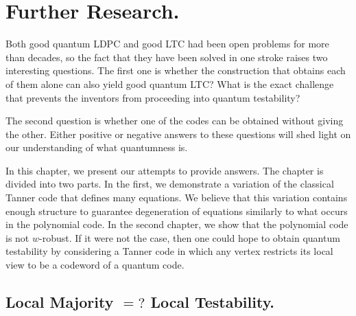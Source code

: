 
\chapter{Further Research.}
Both good quantum LDPC and good LTC had been open problems for more than decades, so the fact that they have been solved in one stroke raises two interesting questions. The first one is whether the construction that obtains each of them alone can also yield good quantum LTC? What is the exact challenge that prevents the inventors from proceeding into quantum testability?

The second question is whether one of the codes can be obtained without giving the other. Either positive or negative answers to these questions will shed light on our understanding of what quantumness is.

In this chapter, we present our attempts to provide answers. The chapter is divided into two parts. In the first, we demonstrate a variation of the classical Tanner code that defines many equations. We believe that this variation contains enough structure to guarantee degeneration of equations similarly to what occurs in the polynomial code. In the second chapter, we show that the polynomial code is not $w$-robust. If it were not the case, then one could hope to obtain quantum testability by considering a Tanner code in which any vertex restricts its local view to be a codeword of a quantum code.



\section{Local Majority $=?$ Local Testability.}




